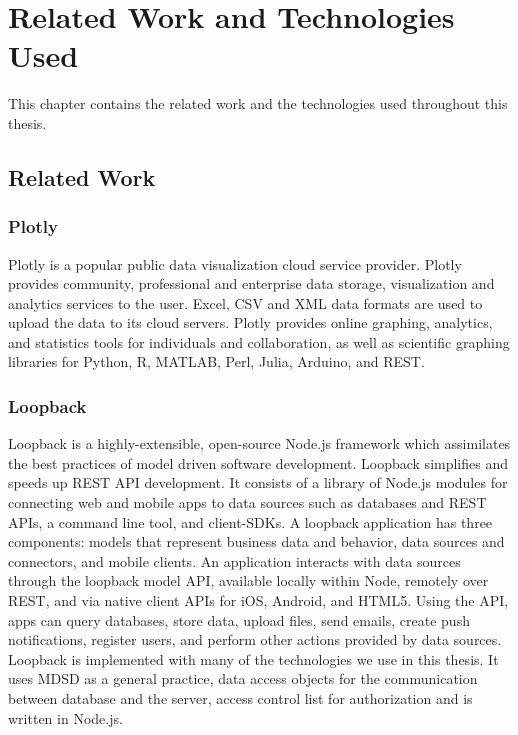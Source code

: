 
\chapter{Related Work and Technologies Used} %

\label{chapter3_rw}
This chapter contains the related work and the technologies used throughout this thesis.

\section{Related Work}

\subsection{Plotly}
Plotly is a popular public data visualization cloud service provider. Plotly provides community, professional and enterprise data storage, visualization and analytics services to the user.  Excel, CSV and XML data formats are used to upload the data to its cloud servers.  Plotly provides online graphing, analytics, and statistics tools for individuals and collaboration, as well as scientific graphing libraries for Python, R, MATLAB, Perl, Julia, Arduino, and REST.

\subsection{Loopback}
Loopback is a highly-extensible, open-source Node.js framework which assimilates the best practices of model driven software development. Loopback simplifies and speeds up REST API development. It consists of a library of Node.js modules for connecting web and mobile apps to data sources such as databases and REST APIs, a command line tool, and client-SDKs. A loopback application has three components: models that represent business data and behavior, data sources and connectors, and mobile clients. An application interacts with data sources through the loopback model API, available locally within Node, remotely over REST, and via native client APIs for iOS, Android, and HTML5. Using the API, apps can query databases, store data, upload files, send emails, create push notifications, register users, and perform other actions provided by data sources.
	Loopback is implemented with many of the technologies we use in this thesis. It uses MDSD as a general practice, data access objects for the communication between database and the server, access control list for  authorization and is written in Node.js.

